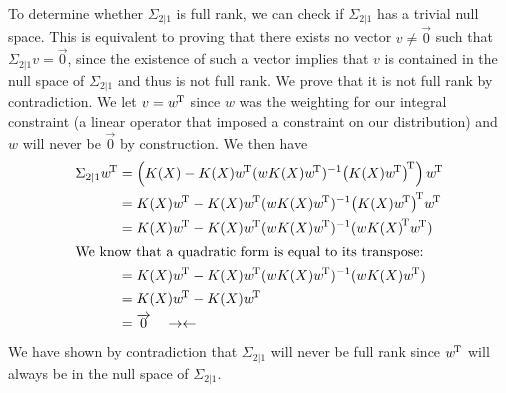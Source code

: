 To determine whether $\Sigma_{2|1}$ is full rank, we can check if $\Sigma_{2 | 1}$
has a trivial null space. This is equivalent to proving that there exists no
vector $v \ne \overrightarrow{0}$ such that $\Sigma_{2 | 1} v = \overrightarrow{0}$, since the existence of such a vector
implies that $v$ is contained in the null space of $\Sigma_{2 | 1}$ and thus is not full rank.
We prove that it is not full rank by contradiction. We let $v={w}^{\!\text{T}}$ since
$w$ was the weighting for our integral constraint (a linear operator that imposed a
constraint on our distribution) and $w$ will never be $\overrightarrow{0}$ by construction. We then have
\begin{align}
  \Sigma_{2|1} \tp{w}
  &= \left(K(X) - K(X) \tp{w} (wK(X)\tp{w})^{-1} \tp{\left(K(X)\tp{w}\right)}\right) \tp{w} \\
  &= K(X)\tp{w} - K(X) \tp{w} (wK(X)\tp{w})^{-1} \tp{\left(K(X)\tp{w}\right)} \tp{w} \\
  &= K(X)\tp{w} - K(X) \tp{w} (wK(X)\tp{w})^{-1} (w\tp{K(X)} \tp{w}) \\
  \intertext{We know that a quadratic form is equal to its transpose:}
  &= K(X)\tp{w} - K(X) \tp{w} (wK(X)\tp{w})^{-1} (wK(X) \tp{w}) \\
  &= K(X)\tp{w} - K(X) \tp{w}\\
  &= \overrightarrow{0}\quad \rightarrow \leftarrow
\end{align}
We have shown by contradiction that $\Sigma_{2|1}$ will never be full rank since ${w}^{\!\text{T}}$ will 
always be in the null space of $\Sigma_{2|1}$. 
